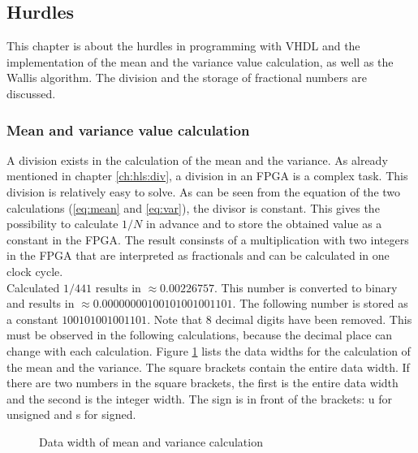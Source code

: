 \subsection{Hurdles} \label{ch:ip:hurdles_vhdl}
This chapter is about the hurdles in programming with VHDL and the
implementation of the mean and the variance value calculation, as well as the
Wallis algorithm.
The division and the storage of fractional numbers are discussed.

\subsubsection*{Mean and variance value calculation}
A division exists in the calculation of the mean and the variance. As already mentioned in chapter \ref{ch:hls:div}, a division in an FPGA is a complex task.
This division is relatively easy to solve. As can be seen from the equation of
the two calculations (\ref{eq:mean} and \ref{eq:var}), the divisor is constant.
This gives the possibility to calculate $1/N$ in advance and to store the
obtained value as a constant in the FPGA. The result consinsts of a multiplication with
two integers in the FPGA that are interpreted as fractionals and can be
calculated in one clock cycle. \\
Calculated $1/441$ results in $\approx 0.00226757$. This number is converted to
binary and results in $\approx 0.00000000100101001001101$. The following number
is stored as a constant $100101001001101$. Note that 8 decimal digits have been
removed. This must be observed in the following calculations, because the
decimal place can change with each calculation. Figure \ref{fig:data_mean_var}
lists the data widths for the calculation of the mean and the variance. The
square brackets contain the entire data width. If there are two numbers in the
square brackets, the first is the entire data width and the second is the
integer width. The sign is in front of the brackets: u for unsigned and s for
signed.

\begin{figure}[tb!]
    \centering
    \begin{adjustbox}{max width=\textwidth, keepaspectratio}
        
    \end{adjustbox}
    \caption{Data width of mean and variance calculation}
    \label{fig:data_mean_var}
\end{figure}

